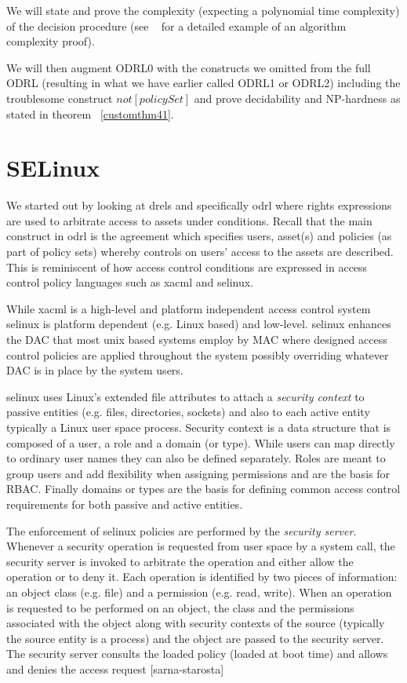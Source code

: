 We will state and prove the complexity (expecting a polynomial time complexity) of the decision procedure (see ~\cite{quicksortInCoq} for a detailed example of an algorithm complexity proof). 

We will then augment ODRL0 with the constructs we omitted from the full ODRL (resulting in what we have earlier called ODRL1 or ODRL2) including the troublesome construct $not[policySet]$ and prove decidability and NP-hardness as stated in theorem ~\ref{customthm41}.

\section{SELinux}
 
We started out by looking at \ac{drel}s and specifically \ac{odrl} where rights expressions are used to arbitrate access to assets under conditions. Recall that the main construct in \ac{odrl} is the agreement which specifies users, asset(s) and policies (as part of policy sets) whereby controls on users' access to the assets are described. This is reminiscent of how access control conditions are expressed in access control policy languages such as \ac{xacml} and \ac{selinux}.

While \ac{xacml} is a high-level and platform independent access control system \ac{selinux} is platform dependent (e.g. Linux based) and low-level. \ac{selinux} enhances the \ac{DAC} that most unix based systems employ by \ac{MAC} where designed access control policies are applied throughout the system possibly overriding whatever \ac{DAC} is in place by the system users. 

\ac{selinux} uses Linux's extended file attributes to attach a \emph{security context} to passive entities (e.g. files, directories, sockets) and also to each active entity typically a Linux user space process. Security context is a data structure that is composed of a user, a role and a domain (or type). While users can map directly to ordinary user names they can also be defined separately. Roles are meant to group users and add flexibility when assigning permissions and are the basis for \ac{RBAC}. Finally domains or types are the basis for defining common access control requirements for both passive and active entities. 


The enforcement of \ac{selinux} policies are performed by the \emph{security server}. Whenever a security operation is requested from user space by a system call, the security server is invoked to arbitrate the operation and either allow the operation or to deny it. Each operation is identified by two pieces of information: an object class (e.g. file) and a permission (e.g. read, write). When an operation is requested to be performed on an object, the class and the permissions associated with the object along with security contexts of the source (typically the source entity is a process) and the object are passed to the security server. The security server consults the loaded policy (loaded at 
boot time) and allows and denies the access request [sarna-starosta]

